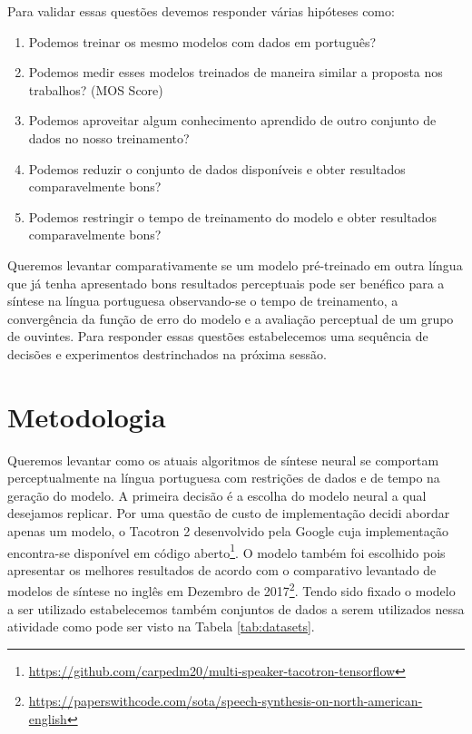 \documentclass{article}
\begin{document}
Para validar essas questões devemos responder várias hipóteses como:

\begin{enumerate}
	\item \label{it:h1} Podemos treinar os mesmo modelos com dados em português?
	\item \label{it:h2} Podemos medir esses modelos treinados de maneira similar a proposta nos trabalhos? (MOS Score)
	\item \label{it:h3} Podemos aproveitar algum conhecimento aprendido de outro conjunto de dados no nosso treinamento? 
	\item \label{it:h4} Podemos reduzir o conjunto de dados disponíveis e obter resultados comparavelmente bons?
	\item \label{it:h5} Podemos restringir o tempo de treinamento do modelo e obter resultados comparavelmente bons?
\end{enumerate}

Queremos levantar comparativamente se um modelo pré-treinado em outra língua que já tenha apresentado bons resultados perceptuais pode ser benéfico para a síntese na língua portuguesa observando-se o tempo de treinamento, a convergência da função de erro do modelo e a avaliação perceptual de um grupo de ouvintes.
Para responder essas questões estabelecemos uma sequência de decisões e experimentos destrinchados na próxima sessão.

\section{Metodologia}

Queremos levantar como os atuais algoritmos de síntese neural se comportam perceptualmente na língua portuguesa com restrições de dados e de tempo na geração do modelo. 
A primeira decisão é a escolha do modelo neural a qual desejamos replicar. 
Por uma questão de custo de implementação decidi abordar apenas um modelo, o Tacotron 2 \cite{tacotron2} desenvolvido pela Google cuja implementação encontra-se disponível em código aberto\footnote{\url{https://github.com/carpedm20/multi-speaker-tacotron-tensorflow}}.
O modelo também foi escolhido pois apresentar os melhores resultados de acordo com o comparativo levantado de modelos de síntese no inglês em Dezembro de 2017\footnote{\url{https://paperswithcode.com/sota/speech-synthesis-on-north-american-english}}.
Tendo sido fixado o modelo a ser utilizado estabelecemos também conjuntos de dados a serem utilizados nessa atividade como pode ser visto na Tabela \ref{tab:datasets}.
\end{document}
